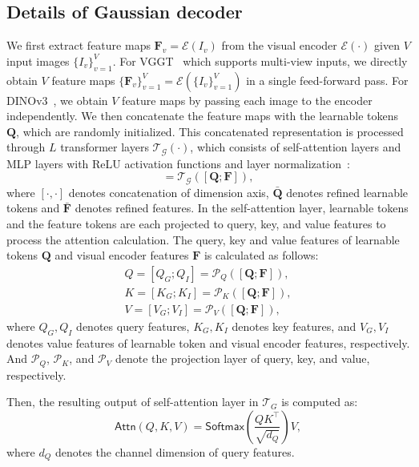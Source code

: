 \subsection{Details of Gaussian decoder}
We first extract feature maps $\mathbf{F}_v = \mathcal{E}(I_v)$ from the visual encoder $\mathcal{E}(\cdot)$ given $V$ input images $\{I_v\}_{v=1}^V$. For VGGT~\cite{wang2025vggt} which supports multi-view inputs, we directly obtain $V$ feature maps $\{\mathbf{F}_v\}_{v=1}^V = \mathcal{E}(\{I_v\}_{v=1}^V)$ in a single feed-forward pass. For \mbox{DINOv3~\cite{simeoni2025dinov3}}, we obtain $V$ feature maps by passing each image to the encoder independently. We then concatenate the feature maps with the learnable tokens $\mathbf{Q}$, which are randomly initialized. This concatenated representation is processed through $L$ transformer layers $\mathcal{T}_\mathcal{G}(\cdot)$, which consists of self-attention layers and MLP layers with ReLU activation functions and layer normalization~\cite{ba2016layer}:
\begin{equation}
    [\bar{\mathbf{Q}};\bar{\mathbf{F}}] = \mathcal{T}_\mathcal{G}([\mathbf{Q};\mathbf{F}]),
\end{equation}
where $[\cdot,\cdot]$ denotes concatenation of dimension axis, $\bar{\mathbf{Q}}$ denotes refined learnable tokens and $\bar{\mathbf{F}}$ denotes refined features. 
In the self-attention layer, learnable tokens and the feature tokens are each projected to query, key, and value features to process the attention calculation. The query, key and value features of learnable tokens $\mathbf{Q}$ and visual encoder features $\mathbf{F}$ is calculated as follows:
\begin{align}
Q = [Q_G;Q_I] = \mathcal{P}_Q([\mathbf{Q};\mathbf{F}]), \\ K = [K_G;K_I] = \mathcal{P}_K([\mathbf{Q};\mathbf{F}]), \\ V =[V_G;V_I] = \mathcal{P}_V([\mathbf{Q};\mathbf{F}]),
\end{align}
where $Q_G, Q_I$ denotes query features, $K_G, K_I$ denotes key features, and $V_G, V_I$ denotes value features of learnable token and visual encoder features, respectively. And $\mathcal{P}_Q$, $\mathcal{P}_K$, and $\mathcal{P}_V$ denote the projection layer of query, key, and value, respectively.

Then, the resulting output of self-attention layer in $\mathcal{T}_G$ is computed as:
\begin{equation}
    \mathsf{Attn}(Q,K,V) = \mathsf{Softmax}(\frac{QK^\intercal}{\sqrt{d_Q}})V,
\end{equation}
where $d_Q$ denotes the channel dimension of query features.

